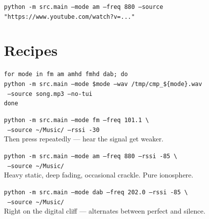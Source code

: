 \documentclass[11pt,a4paper]{article}
\newcommand{\cmd}[1]{\textcolor{radioDark}{\texttt{#1}}}
\newcommand{\key}[1]{\textcolor{radioBlue}{\framebox{\texttt{#1}}}}
\begin{document}
\begin{center}
\cmd{python -m src.main --mode am --freq 880 --source "https://www.youtube.com/watch?v=..."}
\end{center}

\section{Recipes}

\begin{tcolorbox}[colback=radioBlue!8, colframe=radioBlue,
    title={\textbf{Compare All 5 Modes (same song)}}]
{\footnotesize
\texttt{for mode in fm am amhd fmhd dab; do}\\
\texttt{\hspace{4mm}python -m src.main --mode \$mode --wav /tmp/cmp\_\$\{mode\}.wav}\\
\texttt{\hspace{8mm} --source song.mp3 --no-tui}\\
\texttt{done}
}
\end{tcolorbox}

\begin{tcolorbox}[colback=radioGreen!8, colframe=radioGreen,
    title={\textbf{Driving Away from a Station}}]
{\footnotesize
\texttt{python -m src.main --mode fm --freq 101.1 \textbackslash}\\
\texttt{\hspace{4mm} --source \textasciitilde/Music/ --rssi -30}\\[1mm]
Then press \key{[} repeatedly --- hear the signal get weaker.
}
\end{tcolorbox}

\begin{tcolorbox}[colback=radioYellow!8, colframe=radioYellow,
    title={\textbf{Distant AM Station at Night}}]
{\footnotesize
\texttt{python -m src.main --mode am --freq 880 --rssi -85 \textbackslash}\\
\texttt{\hspace{4mm} --source \textasciitilde/Music/}\\[1mm]
Heavy static, deep fading, occasional crackle. Pure ionosphere.
}
\end{tcolorbox}

\begin{tcolorbox}[colback=radioCyan!8, colframe=radioCyan,
    title={\textbf{DAB+ Cliff Effect Demo}}]
{\footnotesize
\texttt{python -m src.main --mode dab --freq 202.0 --rssi -85 \textbackslash}\\
\texttt{\hspace{4mm} --source \textasciitilde/Music/}\\[1mm]
Right on the digital cliff --- alternates between perfect and silence.
}
\end{tcolorbox}
\end{document}
